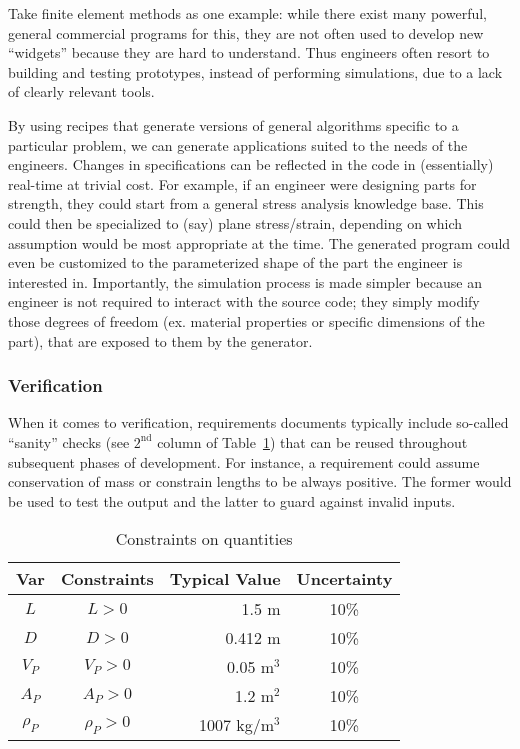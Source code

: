 \documentclass{sig-alternate-05-2015}
\begin{document}
Take finite element methods as one example:  while there exist many powerful,
general commercial programs for this, they are not often used to
develop new ``widgets'' because they are hard to understand.  Thus
engineers often resort to building and testing prototypes, instead of
performing simulations, due to a lack of clearly relevant tools.

By using recipes that generate versions of general algorithms specific to
a particular problem, we can generate applications suited to the needs of
the engineers.  Changes in specifications can be reflected in the code in
(essentially) real-time at trivial cost. For example, if an engineer were
designing parts for strength, they could start from a general stress analysis
knowledge base.  This could then be specialized to (say) plane stress/strain,
depending on which assumption would be most appropriate at the time. The
generated program could even be customized to the parameterized shape of
the part the engineer is interested in.  %
Importantly, the simulation process is made simpler because an engineer is not
required to interact with the source code; they simply modify those degrees of
freedom (ex. material properties or specific dimensions of the part), that are
exposed to them by the generator.

\subsubsection{Verification} \label{sssec:adv_verify}

When it comes to verification, requirements documents typically include
so-called ``sanity'' checks (see $2^{\text{nd}}$ column of Table~\ref{tab:pcm})
that can be reused throughout subsequent phases of development. For instance, a
requirement could assume conservation of mass or constrain lengths to be always
positive. The former would be used to test the output and the latter to guard
against invalid inputs.

\begin{table} 
\centering
\caption{Constraints on quantities}
\begin{tabular}{|c|c|r|c|} \hline
\textbf{Var} & \textbf{Constraints} & \textbf{Typical Value} & \textbf{Uncertainty}\\ \hline
$L$ & $L > 0$ & 1.5 m & 10\% \\ \hline
$D$ & $D > 0$ & 0.412 m & 10\% \\ \hline
$V_P$ & $V_P > 0$ & 0.05 m$^3$	& 10\% \\ \hline
$A_P$ & $A_P > 0$ & 1.2 m$^2$	& 10\% \\ \hline
$\rho_P$ & $\rho_P > 0$	& 1007 kg/m$^3$	& 10\% \\
\hline\end{tabular}
\label{tab:pcm}
\end{table}
\end{document}
